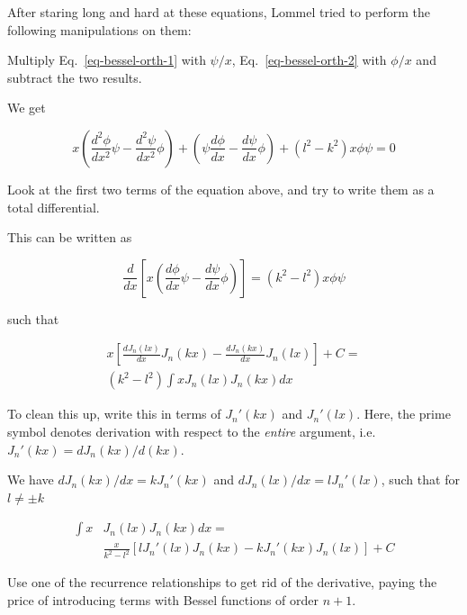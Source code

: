 After staring long and hard at these equations, Lommel tried to perform the following manipulations on them:

\begin{cue}
Multiply Eq.~\ref{eq-bessel-orth-1} with $\psi/x$, Eq.~\ref{eq-bessel-orth-2} with $\phi/x$ and subtract the two results.  
\end{cue}

We get

\begin{equation}
x \left( \frac{d^2 \phi}{dx^2}\psi - \frac{d^2 \psi}{dx^2} \phi \right) + \left(\psi \frac{d \phi}{dx}- \frac{d \psi}{dx}\phi\right) + \left(l^2 - k^2\right) x \phi \psi = 0
\end{equation}

\begin{cue}
Look at the first two terms of the equation above, and try to write them as a total differential. 
\end{cue}

This can be written as

\begin{equation}
\frac{d}{dx}\left[x \left( \frac{d \phi}{dx} \psi - \frac{d \psi}{dx} \phi\right)\right] = \left(k^2 - l^2\right) x \phi \psi
\end{equation}

such that

\begin{align}
x \left[{\frac{dJ_n(lx)}{dx}  J_n(kx) - \frac{dJ_n(kx)}{dx} J_n(lx)}\right] + C = \nonumber \\ \left(k^2 - l^2\right)\int x J_n(lx)J_n(kx)dx
\end{align}

\begin{cue}
To clean this up, write this in terms of $J_n'(kx)$ and  $J_n'(lx)$. Here, the prime symbol denotes derivation with respect to the \emph{entire} argument, i.e. $J_n'(kx)=dJ_n(kx)/d(kx)$. 
\end{cue}

We have $dJ_n(kx)/dx = kJ_n'(kx)$ and $dJ_n(lx)/dx = lJ_n'(lx)$, such that for $l \ne \pm k$

\begin{align}
  \int x & J_n(lx)J_n(kx)dx = \nonumber \\
  & \frac{x}{k^2 - l^2} \left[{l J_n'(lx) J_n(kx) - k J_n'(kx) J_n(lx)}\right] + C \label{eq-lommel-1}
\end{align} 

\begin{cue}
Use one of the recurrence relationships to get rid of the derivative, paying the price of introducing terms with Bessel functions of order $n+1$.
\end{cue}


